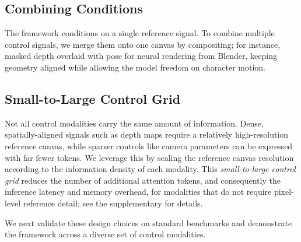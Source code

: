 \subsection{Combining Conditions}
The framework conditions on a single reference signal. To combine multiple control signals, we merge them onto one canvas by compositing; for instance, masked depth overlaid with pose for neural rendering from Blender, keeping geometry aligned while allowing the model freedom on character motion.

\subsection{Small-to-Large Control Grid}
Not all control modalities carry the same amount of information. Dense, spatially-aligned signals such as depth maps require a relatively high-resolution reference canvas, while sparser controls like camera parameters can be expressed with far fewer tokens. We leverage this by scaling the reference canvas resolution according to the information density of each modality. This \emph{small-to-large control grid} reduces the number of additional attention tokens, and consequently the inference latency and memory overhead, for modalities that do not require pixel-level reference detail; see the supplementary for details.


\noindent We next validate these design choices on standard benchmarks and demonstrate the framework across a diverse set of control modalities.
